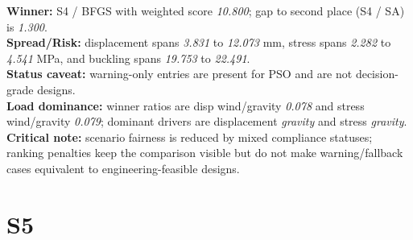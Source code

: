 \begin{samepage}
\noindent \textbf{Winner:} S4 / BFGS with weighted score \textit{10.800}; gap to second place (S4 / SA) is \textit{1.300}.\\
\noindent \textbf{Spread/Risk:} displacement spans \textit{3.831} to \textit{12.073} mm, stress spans \textit{2.282} to \textit{4.541} MPa, and buckling spans \textit{19.753} to \textit{22.491}.\\
\noindent \textbf{Status caveat:} warning-only entries are present for PSO and are not decision-grade designs.\\
\noindent \textbf{Load dominance:} winner ratios are disp wind/gravity \textit{0.078} and stress wind/gravity \textit{0.079}; dominant drivers are displacement \textit{gravity} and stress \textit{gravity}.\\
\noindent \textbf{Critical note:} scenario fairness is reduced by mixed compliance statuses; ranking penalties keep the comparison visible but do not make warning/fallback cases equivalent to engineering-feasible designs.
\end{samepage}


\section{S5}


\begin{table}[H]
\centering
\scriptsize
\setlength{\tabcolsep}{4pt}
\renewcommand{\arraystretch}{1.1}
\end{table}


